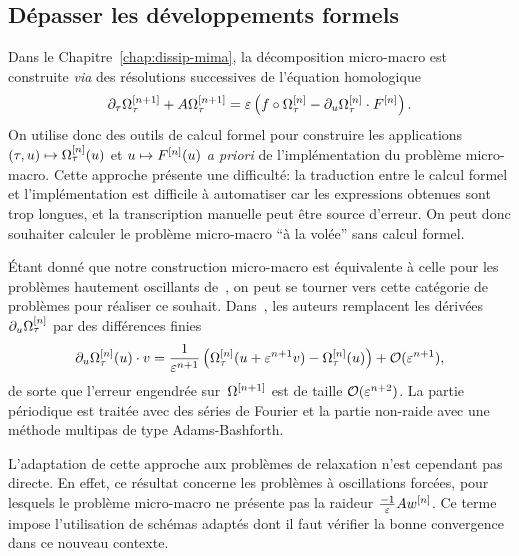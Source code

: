 \subsection{Dépasser les développements formels}

Dans le Chapitre~\ref{chap:dissip-mima}, la décomposition micro-macro est construite \textit{via} des résolutions successives de l'équation homologique
\begin{equation}
    \partial_\tau \Omega^{[n+1]} _\tau + A\Omega^{[n+1]} _\tau
    = \varepsilon \left( 
        f \circ \Omega^{[n]} _\tau 
        - \partial_u \Omega^{[n]} _\tau \cdot F^{[n]} 
    \right) .
\end{equation}
On utilise donc des outils de calcul formel pour construire les applications~$(\tau, u) \mapsto \Omega^{[n]} _\tau(u)$ et $u \mapsto F^{[n]} (u)$ \textit{a priori} de l'implémentation du problème micro-macro. Cette approche présente une difficulté: la traduction entre le calcul formel et l'implémentation est difficile à automatiser car les expressions obtenues sont trop longues, et la transcription manuelle peut être source d'erreur. On peut donc souhaiter calculer le problème micro-macro \enquote{à la volée} sans calcul formel. 

Étant donné que notre construction micro-macro est équivalente à celle pour les problèmes hautement oscillants de~\cite{chartier.2020.new}, on peut se tourner vers cette catégorie de problèmes pour réaliser ce souhait. Dans~\cite{chartier.2020.derivative}, les auteurs remplacent les dérivées $\partial_u \Omega^{[n]} _\tau$ par des différences finies 
\begin{equation*}
    \partial_u \Omega^{[n]} _\tau (u) \cdot v
    = \frac{1}{\varepsilon^{n+1}} \left( 
        \Omega^{[n]} _\tau (u + \varepsilon^{n+1} v ) - \Omega^{[n]} _\tau (u)
    \right) + \mathcal{O}( \varepsilon^{n+1} ) ,
\end{equation*}
de sorte que l'erreur engendrée sur~$\Omega^{[n+1]}$ est de taille $\mathcal{O}(\varepsilon^{n+2})$. La partie périodique est traitée avec des séries de Fourier et la partie non-raide avec une méthode multipas de type Adams-Bashforth.

L'adaptation de cette approche aux problèmes de relaxation n'est cependant pas directe. En effet, ce résultat concerne les problèmes à oscillations forcées, pour lesquels le problème micro-macro ne présente pas la raideur $\frac{-1}{\varepsilon}A w^{[n]}$. Ce terme impose l'utilisation de schémas adaptés dont il faut vérifier la bonne convergence dans ce nouveau contexte.




